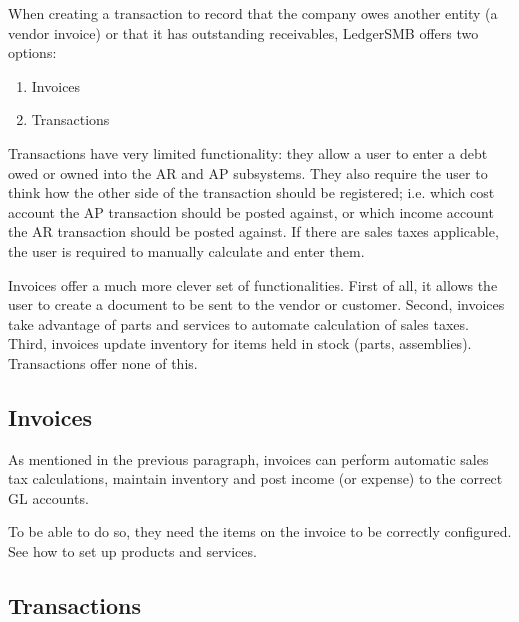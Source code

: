 When creating a transaction to record that the company owes another
entity (a vendor invoice) or that it has outstanding receivables,
LedgerSMB offers two options:

\begin{enumerate}
\item Invoices
\item Transactions
\end{enumerate}

Transactions have very limited functionality: they allow a user to enter
a debt owed or owned into the AR and AP subsystems. They also require the
user to think how the other side of the transaction should be registered;
i.e. which cost account the AP transaction should be posted against, or
which income account the AR transaction should be posted against. If there
are sales taxes applicable, the user is required to manually calculate and
enter them.

Invoices offer a much more clever set of functionalities. First of all, it
allows the user to create a document to be sent to the vendor or \gls{customer}.
Second, invoices take advantage of parts and services
to automate calculation of sales taxes. Third, invoices update inventory
for items held in stock (parts, assemblies). Transactions offer none of this.

\subsection{Invoices}
\label{subsec-business-processes-invoicing-manual-entry-invoices}


As mentioned in the previous paragraph, invoices can perform automatic
sales tax calculations, maintain inventory and post income (or expense)
to the correct GL accounts.

To be able to do so, they need the items on the invoice to be correctly
configured. See  how to set up products
and services.




\subsection{Transactions}
\label{subsec-business-processes-invoicing-manual-entry-transactions}

